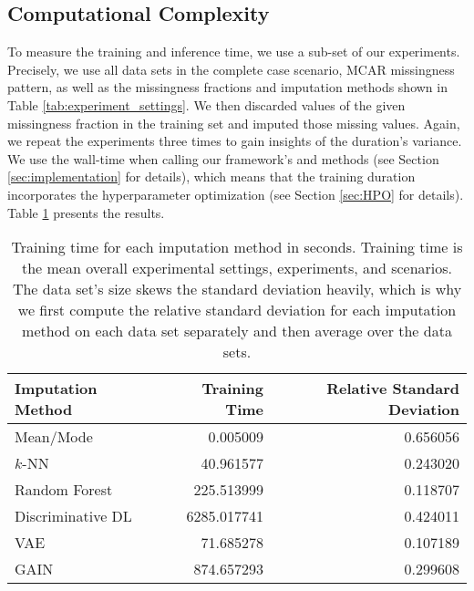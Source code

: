 \subsection{Computational Complexity}
%
To measure the training and inference time, we use a sub-set of our experiments. Precisely, we use all data sets in the complete case scenario, MCAR missingness pattern, as well as the missingness fractions and imputation methods shown in Table \ref{tab:experiment_settings}. We then discarded values of the given missingness fraction in the training set and imputed those missing values. Again, we repeat the experiments three times to gain insights of the duration's variance. We use the wall-time when calling our framework's  and  methods (see Section \ref{sec:implementation} for details), which means that the training duration incorporates the hyperparameter optimization (see Section \ref{sec:HPO} for details). Table \ref{tab:time} presents the results.
%
\begin{table}
	\centering
	\label{tab:time}
	\begin{tabular}{lrr}
		\toprule
		Imputation Method &  Training Time &  Relative Standard Deviation \\
		\midrule
		Mean/Mode &       0.005009 &                     0.656056 \\
		$k$-NN &      40.961577 &                     0.243020 \\
		Random Forest &     225.513999 &                     0.118707 \\
		Discriminative DL &    6285.017741 &                     0.424011 \\
		VAE &      71.685278 &                     0.107189 \\
		GAIN &     874.657293 &                     0.299608 \\
		\bottomrule
	\end{tabular}
	\caption{Training time for each imputation method in seconds. Training time is the mean overall experimental settings, experiments, and scenarios. The data set's size skews the standard deviation heavily, which is why we first compute the relative standard deviation for each imputation method on each data set separately and then average over the data sets.}
\end{table}
